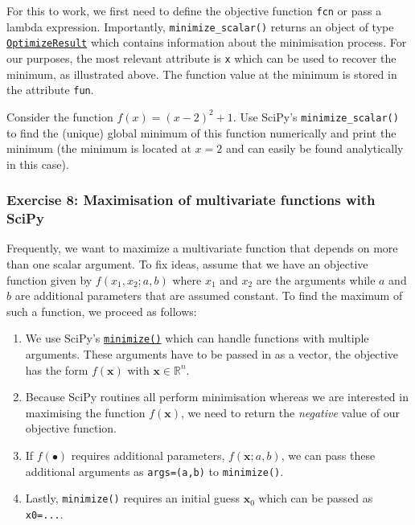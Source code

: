 \documentclass{scrartcl}
\providecommand{\tightlist}{%
      \setlength{\itemsep}{0pt}\setlength{\parskip}{0pt}}
\begin{document}
    For this to work, we first need to define the objective function
\texttt{fcn} or pass a lambda expression. Importantly,
\texttt{minimize\_scalar()} returns an object of type
\href{https://docs.scipy.org/doc/scipy/reference/generated/scipy.optimize.OptimizeResult.html}{\texttt{OptimizeResult}}
which contains information about the minimisation process. For our
purposes, the most relevant attribute is \texttt{x} which can be used to
recover the minimum, as illustrated above. The function value at the
minimum is stored in the attribute \texttt{fun}.

    Consider the function \(f(x) = (x - 2)^2 + 1\). Use SciPy's
\texttt{minimize\_scalar()} to find the (unique) global minimum of this
function numerically and print the minimum (the minimum is located at
\(x=2\) and can easily be found analytically in this case).

    \hypertarget{exercise-8-maximisation-of-multivariate-functions-with-scipy}{%
\subsubsection{Exercise 8: Maximisation of multivariate functions with
SciPy}\label{exercise-8-maximisation-of-multivariate-functions-with-scipy}}

Frequently, we want to maximize a multivariate function that depends on
more than one scalar argument. To fix ideas, assume that we have an
objective function given by \(f(x_1, x_2; a, b)\) where \(x_1\) and
\(x_2\) are the arguments while \(a\) and \(b\) are additional
parameters that are assumed constant. To find the maximum of such a
function, we proceed as follows:

\begin{enumerate}
\def\labelenumi{\arabic{enumi}.}
\tightlist
\item
  We use SciPy's
  \href{https://docs.scipy.org/doc/scipy/reference/generated/scipy.optimize.minimize.html}{\texttt{minimize()}}
  which can handle functions with multiple arguments. These arguments
  have to be passed in as a vector, \ie the objective has the form
  \(f(\mathbf{x})\) with \(\mathbf{x} \in \mathbb{R}^n\).
\item
  Because SciPy routines all perform minimisation whereas we are
  interested in maximising the function \(f(\mathbf{x})\), we need to
  return the \emph{negative} value of our objective function.
\item
  If \(f(\bullet)\) requires additional parameters, \eg
  \(f(\mathbf{x}; a, b)\), we can pass these additional arguments as
  \texttt{args=(a,b)} to \texttt{minimize()}.
\item
  Lastly, \texttt{minimize()} requires an initial guess \(\mathbf{x}_0\)
  which can be passed as \texttt{x0=...}.
\end{enumerate}
\end{document}
